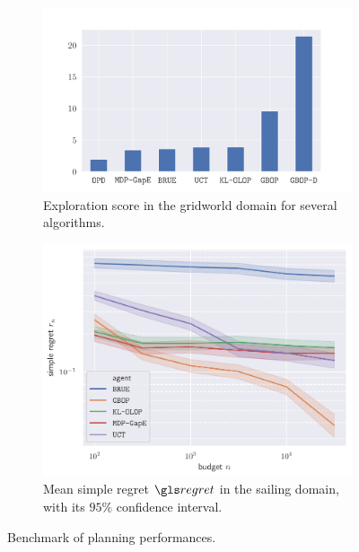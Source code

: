 \begin{figure}[ht]
	\centering
	\begin{subfigure}[b]{0.49\textwidth}
		\includegraphics[trim = {1.6cm 0.cm 2cm 1.5cm}, clip, width=\linewidth]{img/gbop/score.pdf}
		\caption{Exploration score in the gridworld domain for several algorithms.}
		\label{fig:exploration-score}
	\end{subfigure}
	\hfill%
	\begin{subfigure}[b]{0.49\textwidth}
		\includegraphics[trim = {0.2cm 0.2cm 0.7cm 0.5cm}, clip, width=\linewidth]{img/gbop/simple_regret.pdf}
		\caption{Mean simple regret $\regret$ in the sailing domain, with its $95\%$ confidence interval.}
		\label{fig:sailing}
	\end{subfigure}
	\caption{Benchmark of planning performances.}
\end{figure}


